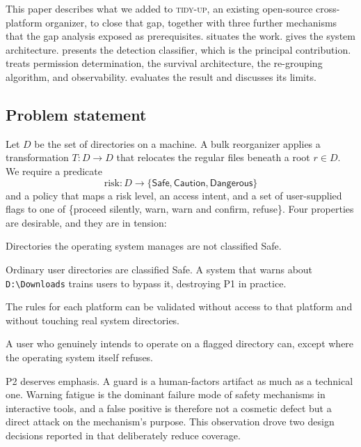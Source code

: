 \documentclass[11pt,a4paper]{article}
\newcommand{\code}[1]{\texttt{\small #1}}
\newcommand{\tool}{\textsc{tidy-up}}
\begin{document}
This paper describes what we added to \tool{}, an existing open-source cross-platform
organizer, to close that gap, together with three further mechanisms that the gap
analysis exposed as prerequisites.  situates the work.
 gives the system architecture.  presents the
detection classifier, which is the principal contribution.  treats
permission determination,  the survival architecture,
 the re-grouping algorithm, and  observability.
 evaluates the result and  discusses its limits.

\subsection{Problem statement}

Let $D$ be the set of directories on a machine. A bulk reorganizer applies a
transformation $T : D \rightarrow D$ that relocates the regular files beneath a root
$r \in D$. We require a predicate
\[
  \mathrm{risk} : D \rightarrow \{\textsf{Safe}, \textsf{Caution}, \textsf{Dangerous}\}
\]
and a policy that maps a risk level, an access intent, and a set of user-supplied
flags to one of \{proceed silently, warn, warn and confirm, refuse\}. Four properties
are desirable, and they are in tension:

\begin{description}[leftmargin=1.6em,itemsep=0.25em]
  \item[P1 (Soundness, informal).] Directories the operating system manages are not
    classified \textsf{Safe}.
  \item[P2 (Precision).] Ordinary user directories are classified \textsf{Safe}. A
    system that warns about \code{D:\textbackslash Downloads} trains users to bypass
    it, destroying P1 in practice.
  \item[P3 (Testability).] The rules for each platform can be validated without
    access to that platform and without touching real system directories.
  \item[P4 (Escapability).] A user who genuinely intends to operate on a flagged
    directory can, except where the operating system itself refuses.
\end{description}

P2 deserves emphasis. A guard is a human-factors artifact as much as a technical one.
Warning fatigue is the dominant failure mode of safety mechanisms in interactive
tools, and a false positive is therefore not a cosmetic defect but a direct attack on
the mechanism's purpose. This observation drove two design decisions reported in
 that deliberately reduce coverage.
\end{document}
